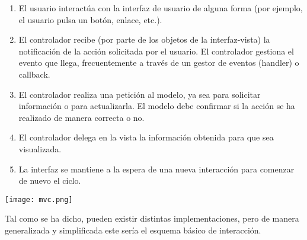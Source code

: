 {
\begin{minipage}{0.56\linewidth}
\begin{enumerate}
    \item El usuario interactúa con la interfaz de usuario de alguna forma (por ejemplo, el usuario pulsa un botón, enlace, etc.).

    \item El controlador recibe (por parte de los objetos de la interfaz-vista) la notificación de la acción solicitada por el usuario. El controlador gestiona el evento que llega, frecuentemente a través de un gestor de eventos (handler) o callback.

    \item El controlador realiza una petición al modelo, ya sea para solicitar información o para actualizarla. El modelo debe confirmar si la acción se ha realizado de manera correcta o no.

    \item El controlador delega en la vista la información obtenida para que sea visualizada.

    \item La interfaz se mantiene a la espera de una nueva interacción para comenzar de nuevo el ciclo.
\end{enumerate}
\end{minipage}
\hfill
\begin{minipage}{0.4\linewidth}
    \texttt{[image: mvc.png]}
\end{minipage}
}

\vspace{10pt}
Tal como se ha dicho, pueden existir distintas implementaciones, pero de manera generalizada y simplificada este sería el esquema básico de interacción.
